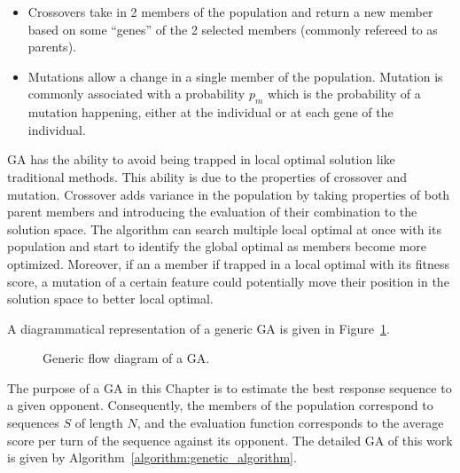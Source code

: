 \begin{itemize}
    \item Crossovers take in 2 members of the population and return a new member
    based on some ``genes'' of the 2 selected members (commonly refereed to as parents).
    \item Mutations allow a change in a single member of the population. Mutation
    is commonly associated with a probability \(p_m\) which is the probability
    of a mutation happening, either at the individual or at each gene of the
    individual.
\end{itemize}

GA has the ability to avoid being trapped in local optimal solution like
traditional methods. This ability is due to the properties of crossover and
mutation. Crossover adds variance in the population by taking properties of both
parent members and introducing the evaluation of their combination to the
solution space. The algorithm can search multiple local optimal at once with its
population and start to identify the global optimal as members become more
optimized. Moreover, if an a member if trapped in a local optimal with its
fitness score, a mutation of a certain feature could potentially move their
position in the solution space to better local optimal.

A diagrammatical representation of a generic GA is given in Figure~\ref{fig:ga_flow_diagram}.

\begin{figure}[!htbp]
    \centering
    
    \caption{Generic flow diagram of a GA.}\label{fig:ga_flow_diagram}
\end{figure}

The purpose of a GA in this Chapter is to estimate the best response sequence to
a given opponent. Consequently, the members of the population correspond to
sequences \(S\) of length \(N\), and the evaluation function corresponds to the
average score per turn of the sequence against its opponent. The detailed GA of
this work is given by Algorithm~\ref{algorithm:genetic_algorithm}.

